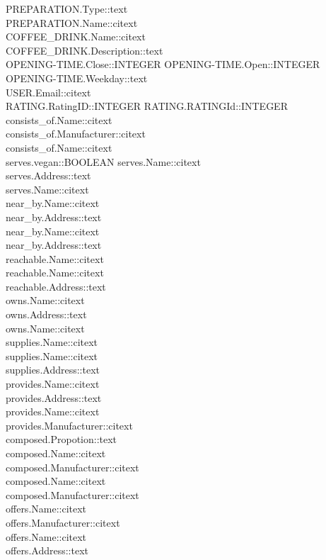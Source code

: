 PREPARATION.Type::text\\
PREPARATION.Name::citext\\
COFFEE\_DRINK.Name::citext\\
COFFEE\_DRINK.Description::text\\
OPENING-TIME.Close::INTEGER
OPENING-TIME.Open::INTEGER
OPENING-TIME.Weekday::text\\
USER.Email::citext\\
RATING.RatingID::INTEGER
RATING.RATINGId::INTEGER
consists\_of.Name::citext\\
consists\_of.Manufacturer::citext\\
consists\_of.Name::citext\\
serves.vegan::BOOLEAN
serves.Name::citext\\
serves.Address::text\\
serves.Name::citext\\
near\_by.Name::citext\\
near\_by.Address::text\\
near\_by.Name::citext\\
near\_by.Address::text\\
reachable.Name::citext\\
reachable.Name::citext\\
reachable.Address::text\\
owns.Name::citext\\
owns.Address::text\\
owns.Name::citext\\
supplies.Name::citext\\
supplies.Name::citext\\
supplies.Address::text\\
provides.Name::citext\\
provides.Address::text\\
provides.Name::citext\\
provides.Manufacturer::citext\\
composed.Propotion::text\\
composed.Name::citext\\
composed.Manufacturer::citext\\
composed.Name::citext\\
composed.Manufacturer::citext\\
offers.Name::citext\\
offers.Manufacturer::citext\\
offers.Name::citext\\
offers.Address::text\\
